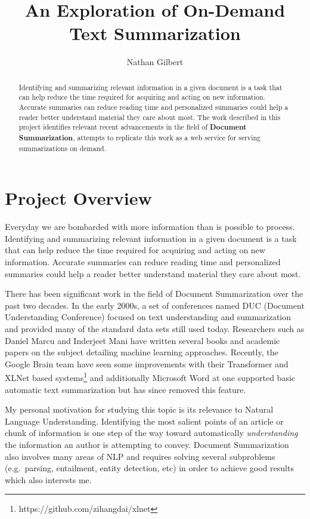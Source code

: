\documentclass{article}
\begin{document}
\title{An Exploration of On-Demand Text Summarization}
\author{Nathan Gilbert}

\maketitle

\begin{abstract}
    Identifying and summarizing relevant information in a given document is a task
    that can help reduce the time required for acquiring and acting on new
    information. Accurate summaries can reduce reading time and personalized
    summaries could help a reader better understand material they care about most.
    The work described in this project identifies relevant recent advancements in
    the field of \textbf{Document Summarization}, attempts to replicate this work as
    a web service for serving summarizations on demand.
\end{abstract}

\section{Project Overview}
Everyday we are bombarded with more information than is possible to process.
Identifying and summarizing relevant information in a given document is a task
that can help reduce the time required for acquiring and acting on new
information. Accurate summaries can reduce reading time and personalized
summaries could help a reader better understand material they care about most.

There has been significant work in the field of Document Summarization over the
past two decades. In the early 2000s, a set of conferences named DUC (Document
Understanding Conference) focused on text understanding and summarization and
provided many of the standard data sets still used today. Researchers such as
Daniel Marcu and Inderjeet Mani have written several books and academic papers
on the subject detailing machine learning approaches. Recently, the Google
Brain team have seen some improvements with their Transformer and XLNet based
systems\footnote{https://github.com/zihangdai/xlnet} and additionally Microsoft
Word at one supported basic automatic text summarization but has since removed
this feature.

My personal motivation for studying this topic is its relevance to Natural
Language Understanding. Identifying the most salient points of an article or
chunk of information is one step of the way toward automatically
\textit{understanding} the information an author is attempting to convey.
Document Summarization also involves many areas of NLP and requires solving several
subproblems (e.g.\ parsing, entailment, entity detection, etc) in order to
achieve good results which also interests me.
\end{document}
